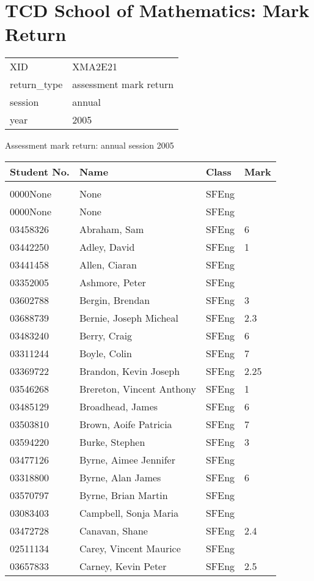 \documentclass[a4paper]{article}
\begin{document}
\section*{TCD School of Mathematics: Mark Return}
\begin{tabular}{ll}
XID&XMA2E21\\
return_type&assessment mark return\\
session&annual\\
year&2005\\
\end{tabular}
\begin{center}
Assessment mark return: annual session 2005
\end{center}

\begin{tabular}{llll}
Student No.&Name&Class&Mark\\[3pt]
 \hline\\[3pt]
0000None&None&SFEng&\\
0000None&None&SFEng&\\
03458326&Abraham, Sam&SFEng&6\\
03442250&Adley, David&SFEng&1\\
03441458&Allen, Ciaran&SFEng&\\
03352005&Ashmore, Peter&SFEng&\\
03602788&Bergin, Brendan&SFEng&3\\
03688739&Bernie, Joseph Micheal&SFEng&2.3\\
03483240&Berry, Craig&SFEng&6\\
03311244&Boyle, Colin&SFEng&7\\
03369722&Brandon, Kevin Joseph&SFEng&2.25\\
03546268&Brereton, Vincent Anthony&SFEng&1\\
03485129&Broadhead, James&SFEng&6\\
03503810&Brown, Aoife Patricia&SFEng&7\\
03594220&Burke, Stephen&SFEng&3\\
03477126&Byrne, Aimee Jennifer&SFEng&\\
03318800&Byrne, Alan James&SFEng&6\\
03570797&Byrne, Brian Martin&SFEng&\\
03083403&Campbell, Sonja Maria&SFEng&\\
03472728&Canavan, Shane&SFEng&2.4\\
02511134&Carey, Vincent Maurice&SFEng&\\
03657833&Carney, Kevin Peter&SFEng&2.5\\

\end{tabular}
\end{document}
